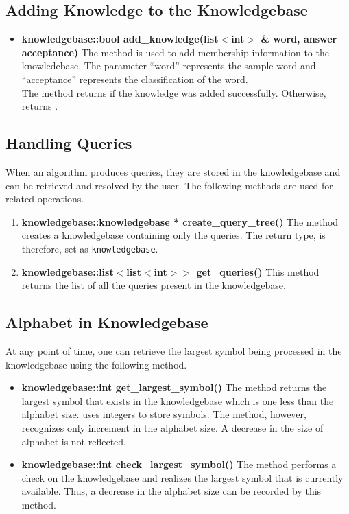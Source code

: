 \subsection*{Adding Knowledge to the Knowledgebase} 
\begin{itemize}
\item \textbf{knowledgebase::bool add\_knowledge(list$<$int$>$ \& word, answer acceptance)} \vskip 1pt
The method is used to add membership information to the knowledebase. The parameter ``word'' represents the sample word and ``acceptance'' represents the classification of the word. \\
The method returns \true if the knowledge was added successfully. Otherwise, returns \false.
\end{itemize}	

\subsection*{Handling Queries}
When an \online algorithm produces queries, they are stored in the knowledgebase and can be retrieved and resolved by the user. The following methods are used for related operations.

\begin{enumerate}
\item \textbf{knowledgebase::knowledgebase * create\_query\_tree()} \vskip 1pt
The method creates a knowledgebase containing only the queries. The return type, is therefore, set as \texttt{knowledgebase}.
	
\item \textbf{knowledgebase::list$<$list$<$int$>$$>$ get\_queries()} \vskip 1pt
This method returns the list of all the queries present in the knowledgebase.
\end{enumerate}

\subsection*{Alphabet in Knowledgebase}
At any point of time, one can retrieve the largest symbol being processed in the knowledgebase using the following method.

\begin{itemize}
\item \textbf{knowledgebase::int get\_largest\_symbol()} \vskip 1pt 
The method returns the largest symbol that exists in the knowledgebase which is one less than the alphabet size. \libalf uses integers to store symbols. The method, however, recognizes only increment in the alphabet size. A decrease in the size of alphabet is not reflected. 

\item \textbf{knowledgebase::int check\_largest\_symbol()} \hfill \vskip 1pt
The method performs a check on the knowledgebase and realizes the largest symbol that is currently available. Thus, a decrease in the alphabet size can be recorded by this method.
\end{itemize}	

